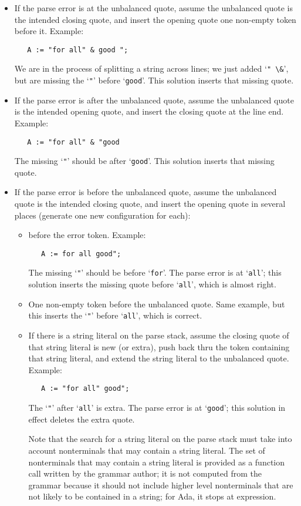 \documentclass[authordraft]{acmart}
\newcommand{\code}[1]{`\lstinline|#1|'}
\begin{document}
\begin{itemize}
\item If the parse error is at the unbalanced quote, assume the unbalanced
quote is the intended closing quote, and insert the opening quote one
non-empty token before it. Example:
\begin{lstlisting}
   A := "for all" & good ";
\end{lstlisting}
We are in the process of splitting a string across lines; we just
added \code{" \&}, but are missing the \code{"} before \code{good}.
This solution inserts that missing quote.

\item If the parse error is after the unbalanced quote, assume the unbalanced
quote is the intended opening quote, and insert the closing quote at
the line end. Example:
\begin{lstlisting}
   A := "for all" & "good
\end{lstlisting}
The missing \code{"} should be after \code{good}.
This solution inserts that missing quote.

\item If the parse error is before the unbalanced quote, assume the unbalanced
quote is the intended closing quote, and insert the opening quote in
several places (generate one new configuration for each):

\begin{itemize}
\item before the error token. Example:
\begin{lstlisting}
   A := for all good";
\end{lstlisting}
The missing \code{"} should be before \code{for}. The parse error is at \code{all};
this solution inserts the missing quote before \code{all}, which is
almost right.

\item One non-empty token before the unbalanced quote. Same example,
  but this inserts the \code{"} before \code{all}, which is correct.

\item If there is a string literal on the parse stack, assume the
  closing quote of that string literal is new (or extra), push back
  thru the token containing that string literal, and extend the string
  literal to the unbalanced quote.
  Example:
\begin{lstlisting}
   A := "for all" good";
\end{lstlisting}
The \code{"} after \code{all} is extra. The parse error is at \code{good};
this solution in effect deletes the extra quote.

Note that the search for a string literal on the parse stack must take
into account nonterminals that may contain a string literal. The set
of nonterminals that may contain a string literal is provided as a
function call written by the grammar author; it is not computed from
the grammar because it should not include higher level nonterminals
that are not likely to be contained in a string; for Ada, it stops at
expression.
\end{itemize}
\end{itemize}
\end{document}
